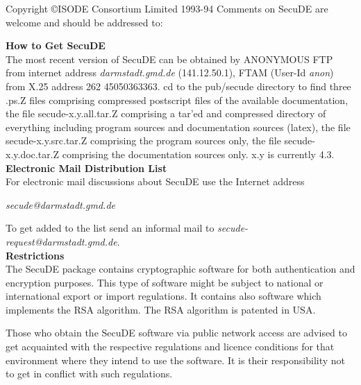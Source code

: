 {        Copyright \copyright ISODE Consortium Limited 1993-94
        \newpage
        Comments on SecuDE are welcome and should be addressed to: 

	\newpage
	{\Large\bf How to Get SecuDE}
	\\ [1em]	
        The most recent version of SecuDE can be obtained by 
	\bi
        \m ANONYMOUS FTP from internet address {\em darmstadt.gmd.de} (141.12.50.1), 
        \m FTAM (User-Id {\em anon}) from X.25 address 262 45050363363.
	\ei 
        cd to the pub/secude directory to find 
	\bi
        \m three .ps.Z files comprising compressed postscript files of the available
           documentation,
        \m the file secude-x.y.all.tar.Z comprising a tar'ed and compressed directory 
           of everything including program sources and documentation sources (latex),
        \m the file secude-x.y.src.tar.Z comprising the program sources only,
        \m the file secude-x.y.doc.tar.Z comprising the documentation sources only.
	\ei
	x.y is currently 4.3.
	\\ [1cm]
	{\Large\bf Electronic Mail Distribution List}
	\\ [1em]
	For electronic mail discussions about SecuDE use the Internet address
	
	{\em secude@darmstadt.gmd.de}
	
	To get added to the list send an informal mail to {\em secude-request@darmstadt.gmd.de}. 
	\\ [1cm]	
	{\Large\bf Restrictions}
	\\ [1em]
	The SecuDE package contains cryptographic software for both authentication and
        encryption purposes. This type of software might be subject to national or
        international export or import regulations. It contains also software which
	implements the RSA algorithm. The RSA algorithm is patented in USA.
	
	Those who obtain the SecuDE software via public network access are advised to get
        acquainted with the respective regulations and licence conditions for that
	environment where they intend to use the software. It is their responsibility
	not to get in conflict with such regulations.
}

